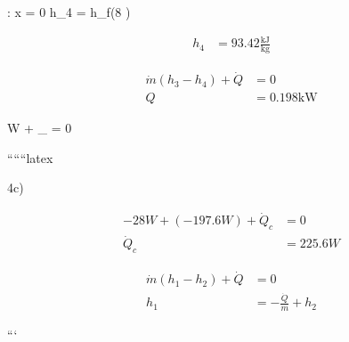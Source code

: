  \rightarrow {} \quad {}  \nu:   \quad x = 0 \quad h_4 = h_f(8 )

\begin{align*}
h_4 &= 93.42 \frac{\text{kJ}}{\text{kg}}
\end{align*}

\begin{align*}
\dot{m}(h_3 - h_4) + \dot{Q} &= 0 \\
Q &= 0.198 \text{kW}
\end{align*}

 \quad W + _{} = 0

``````latex

4c)

\begin{align*}
-28W + (-197.6W) + \dot{Q}_c &= 0 \\
\dot{Q}_c &= 225.6W
\end{align*}

\begin{align*}
\dot{m}(h_1 - h_2) + \dot{Q} &= 0 \\
h_1 &= -\frac{\dot{Q}}{m} + h_2
\end{align*}

```